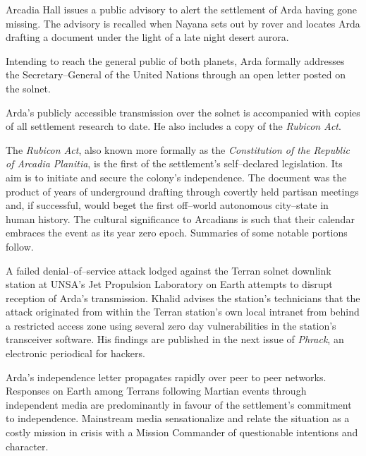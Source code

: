 Arcadia Hall issues a public advisory to alert the settlement of Arda having gone missing. The advisory is recalled when Nayana sets out by rover and locates Arda drafting a document under the light of a late night desert aurora.
\StopTimelineDate


Intending to reach the general public of both planets, Arda formally addresses the Secretary--General of the United Nations through an open letter posted on the solnet.

\startTimelineCorrespondenceDocument
    
\stopTimelineCorrespondenceDocument

Arda's publicly accessible transmission over the solnet is accompanied with copies of all settlement research to date. He also includes a copy of the {\it Rubicon Act}. 

The {\it Rubicon Act}, also known more formally as the {\it Constitution of the Republic of Arcadia Planitia}, is the first of the settlement's self--declared legislation. Its aim is to initiate and secure the colony's independence. The document was the product of years of underground drafting through covertly held partisan meetings and, if successful, would beget the first off--world autonomous city--state in human history. The cultural significance to Arcadians is such that their calendar embraces the event as its year zero epoch. Summaries of some notable portions follow.

\startTimelineGeneralDocument
    
\stopTimelineGeneralDocument

A failed denial--of--service attack lodged against the Terran solnet downlink station at UNSA's Jet Propulsion Laboratory on Earth attempts to disrupt reception of Arda's transmission. Khalid advises the station's technicians that the attack originated from within the Terran station's own local intranet from behind a restricted access zone using several zero day vulnerabilities in the station's transceiver software. His findings are published in the next issue of {\it Phrack}, an electronic periodical for hackers.

Arda's independence letter propagates rapidly over peer to peer networks. Responses on Earth among Terrans following Martian events through independent media are predominantly in favour of the settlement's commitment to independence. Mainstream media sensationalize and relate the situation as a costly mission in crisis with a Mission Commander of questionable intentions and character.
\StopTimelineDate

